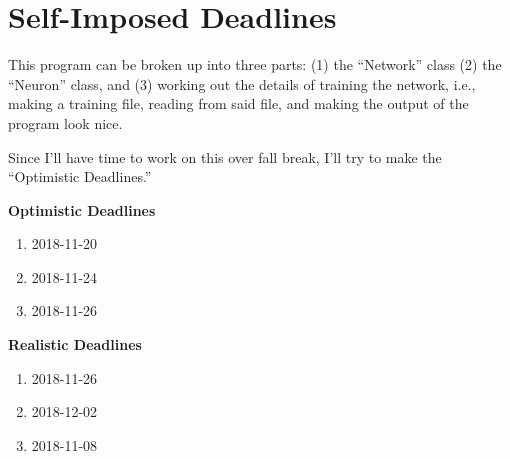 \documentclass{article}
\begin{document}
\section{Self-Imposed Deadlines}

This program can be broken up into three parts: (1) the ``Network'' class (2)
the ``Neuron'' class, and (3) working out the details of training the network,
i.e., making a training file, reading from said file, and making the output of
the program look nice.

Since I'll have time to work on this over fall break, I'll try to make the
``Optimistic Deadlines.''

\textbf{Optimistic Deadlines}

\begin{enumerate}
  \item
  2018-11-20
  \item
  2018-11-24
  \item
  2018-11-26
\end{enumerate}

\textbf{Realistic Deadlines}

\begin{enumerate}
  \item
  2018-11-26
  \item
  2018-12-02
  \item
  2018-11-08
\end{enumerate}
\end{document}
